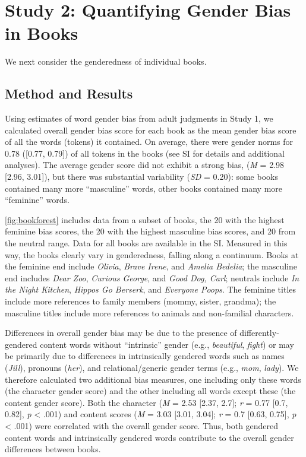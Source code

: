 \documentclass[english,,man,floatsintext]{apa6}
\begin{document}
\hypertarget{study-2-quantifying-gender-bias-in-books}{%
\section{Study 2: Quantifying Gender Bias in Books}\label{study-2-quantifying-gender-bias-in-books}}

We next consider the genderedness of individual books.

\hypertarget{method-and-results-1}{%
\subsection{Method and Results}\label{method-and-results-1}}

Using estimates of word gender bias from adult judgments in Study 1, we calculated overall gender bias score for each book as the mean gender bias score of all the words (tokens) it contained. On average, there were gender norms for 0.78 ({[}0.77, 0.79{]}) of all tokens in the books (see SI for details and additional analyses). The average gender score did not exhibit a strong bias, (\emph{M} = 2.98 {[}2.96, 3.01{]}), but there was substantial variability (\emph{SD} = 0.20): some books contained many more \enquote{masculine} words, other books contained many more \enquote{feminine} words.

\autoref{fig:bookforest} includes data from a subset of books, the 20 with the highest feminine bias scores, the 20 with the highest masculine bias scores, and 20 from the neutral range. Data for all books are available in the SI. Measured in this way, the books clearly vary in genderedness, falling along a continuum. Books at the feminine end include \emph{Olivia}, \emph{Brave Irene}, and \emph{Amelia Bedelia}; the masculine end includes \emph{Dear Zoo}, \emph{Curious George}, and \emph{Good Dog, Carl}; neutrals include \emph{In the Night Kitchen}, \emph{Hippos Go Berserk}, and \emph{Everyone Poops}. The feminine titles include more references to family members (mommy, sister, grandma); the masculine titles include more references to animals and non-familial characters.

Differences in overall gender bias may be due to the presence of differently-gendered content words without \enquote{intrinsic} gender (e.g., \emph{beautiful}, \emph{fight}) or may be primarily due to differences in intrinsically gendered words such as names (\emph{Jill}), pronouns (\emph{her}), and relational/generic gender terms (e.g., \emph{mom}, \emph{lady}). We therefore calculated two additional bias measures, one including only these words (the character gender score) and the other including all words except these (the content gender score). Both the character (\emph{M} = 2.53 {[}2.37, 2.7{]}; \emph{r} = 0.77 {[}0.7, 0.82{]}, \emph{p} \textless{} .001) and content scores (\emph{M} = 3.03 {[}3.01, 3.04{]}; \emph{r} = 0.7 {[}0.63, 0.75{]}, \emph{p} \textless{} .001) were correlated with the overall gender score. Thus, both gendered content words and intrinsically gendered words contribute to the overall gender differences between books.
\end{document}
